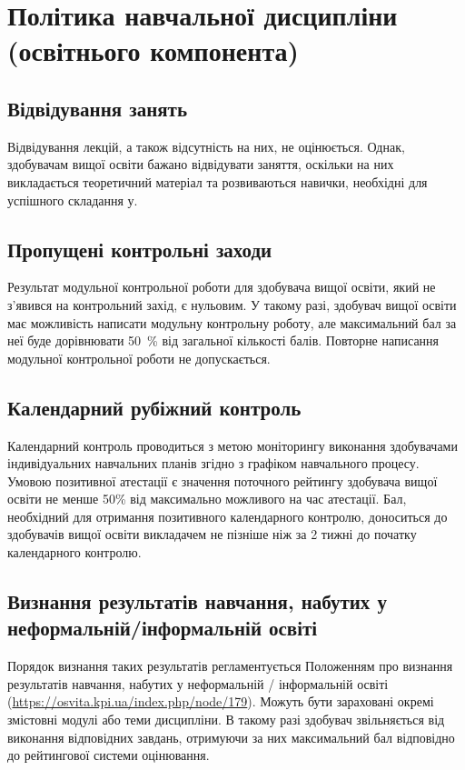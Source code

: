 \documentclass{Syllabus}
\begin{document}
\section{Політика навчальної дисципліни (освітнього компонента)}

\subsection*{Відвідування занять}
Відвідування лекцій, а також відсутність на них, не оцінюється. Однак, здобувачам вищої освіти бажано відвідувати заняття, оскільки на них викладається теоретичний матеріал та розвиваються навички, необхідні для успішного складання \control у.

\subsection*{Пропущені контрольні заходи}

Результат модульної контрольної роботи для здобувача вищої освіти, який не з’явився на контрольний захід, є нульовим. У такому разі, здобувач вищої освіти має можливість написати модульну контрольну роботу, але максимальний бал за неї буде дорівнювати 50~\% від загальної кількості балів. Повторне написання модульної контрольної роботи не допускається.

\subsection*{Календарний рубіжний контроль}

Календарний контроль проводиться з метою моніторингу виконання здобувачами індивідуальних навчальних планів згідно з графіком навчального процесу. Умовою позитивної атестації є значення поточного рейтингу здобувача вищої освіти не менше 50\% від максимально можливого на час атестації. Бал, необхідний для отримання позитивного календарного контролю, доноситься до здобувачів вищої освіти викладачем не пізніше ніж за 2 тижні до початку календарного контролю.

\subsection*{Визнання  результатів  навчання,  набутих  у  неформальній/інформальній освіті}

Порядок визнання таких результатів регламентується Положенням про визнання результатів навчання, набутих у неформальній / інформальній освіті (\url{https://osvita.kpi.ua/index.php/node/179}).  Можуть бути зараховані окремі змістовні модулі або теми дисципліни. В такому разі здобувач звільняється від виконання відповідних завдань, отримуючи за них максимальний бал відповідно до рейтингової системи оцінювання.
\end{document}
